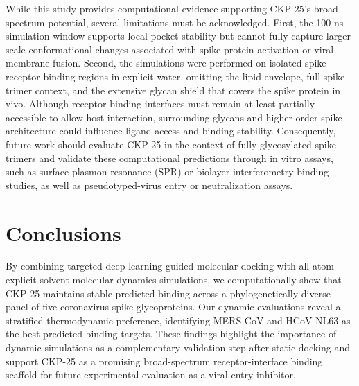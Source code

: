 \documentclass[pharmaceuticals,article,submit,pdftex,moreauthors]{Definitions/mdpi}
\begin{document}
While this study provides computational evidence supporting CKP-25’s broad-spectrum potential, several limitations must be acknowledged. First, the 100-ns simulation window supports local pocket stability but cannot fully capture larger-scale conformational changes associated with spike protein activation or viral membrane fusion. Second, the simulations were performed on isolated spike receptor-binding regions in explicit water, omitting the lipid envelope, full spike-trimer context, and the extensive glycan shield that covers the spike protein in vivo. Although receptor-binding interfaces must remain at least partially accessible to allow host interaction, surrounding glycans and higher-order spike architecture could influence ligand access and binding stability. Consequently, future work should evaluate CKP-25 in the context of fully glycosylated spike trimers and validate these computational predictions through in vitro assays, such as surface plasmon resonance (SPR) or biolayer interferometry binding studies, as well as pseudotyped-virus entry or neutralization assays.

\section{Conclusions}
By combining targeted deep-learning-guided molecular docking with all-atom explicit-solvent molecular dynamics simulations, we computationally show that CKP-25 maintains stable predicted binding across a phylogenetically diverse panel of five coronavirus spike glycoproteins. Our dynamic evaluations reveal a stratified thermodynamic preference, identifying MERS-CoV and HCoV-NL63 as the best predicted binding targets. These findings highlight the importance of dynamic simulations as a complementary validation step after static docking and support CKP-25 as a promising broad-spectrum receptor-interface binding scaffold for future experimental evaluation as a viral entry inhibitor.

\vspace{6pt} 


\end{document}
